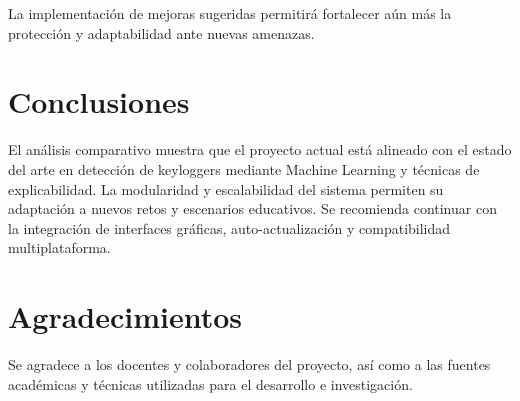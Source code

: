 \documentclass[conference]{IEEEtran}
\begin{document}
La implementación de mejoras sugeridas permitirá fortalecer aún más la protección y adaptabilidad ante nuevas amenazas.

\section{Conclusiones}
El análisis comparativo muestra que el proyecto actual está alineado con el estado del arte en detección de keyloggers mediante Machine Learning y técnicas de explicabilidad. La modularidad y escalabilidad del sistema permiten su adaptación a nuevos retos y escenarios educativos. Se recomienda continuar con la integración de interfaces gráficas, auto-actualización y compatibilidad multiplataforma.

\section*{Agradecimientos}
Se agradece a los docentes y colaboradores del proyecto, así como a las fuentes académicas y técnicas utilizadas para el desarrollo e investigación.
\end{document}
